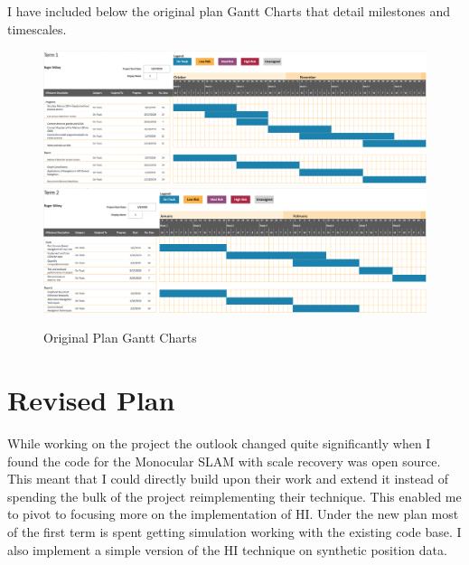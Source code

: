 \documentclass[]{../resources/final_report}
\begin{document}
I have included below the original plan Gantt Charts that detail milestones and timescales.
\\
\begin{figure}[h]
  \centering
  \includegraphics[width=\textwidth]{Term1Ganttv1.png}
  \includegraphics[width=\textwidth]{Term2Ganttv1.png}
  \caption{Original Plan Gantt Charts}
  \label{}
\end{figure}

\section{Revised Plan}

While working on the project the outlook changed quite significantly when I found the code for 
the Monocular SLAM with scale recovery was open source. This meant that I could directly build 
upon their work and extend it instead of spending the bulk of the project reimplementing their 
technique. This enabled me to pivot to focusing more on the implementation of HI. 
Under the new plan most of the first term is spent getting simulation working with the existing 
code base. I also implement a simple version of the HI technique on synthetic 
position data.
\end{document}
